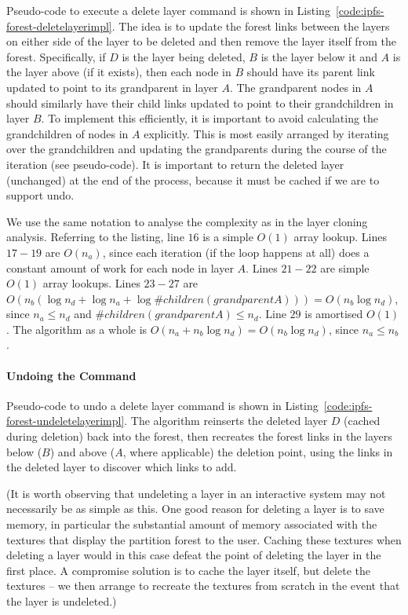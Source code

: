Pseudo-code to execute a delete layer command is shown in Listing~\ref{code:ipfs-forest-deletelayerimpl}. The idea is to update the forest links between the layers on either side of the layer to be deleted and then remove the layer itself from the forest. Specifically, if $D$ is the layer being deleted, $B$ is the layer below it and $A$ is the layer above (if it exists), then each node in $B$ should have its parent link updated to point to its grandparent in layer $A$. The grandparent nodes in $A$ should similarly have their child links updated to point to their grandchildren in layer $B$. To implement this efficiently, it is important to avoid calculating the grandchildren of nodes in $A$ explicitly. This is most easily arranged by iterating over the grandchildren and updating the grandparents during the course of the iteration (see pseudo-code). It is important to return the deleted layer (unchanged) at the end of the process, because it must be cached if we are to support undo.

We use the same notation to analyse the complexity as in the layer cloning analysis. Referring to the listing, line $16$ is a simple $O(1)$ array lookup. Lines $17-19$ are $O(n_a)$, since each iteration (if the loop happens at all) does a constant amount of work for each node in layer $A$. Lines $21-22$ are simple $O(1)$ array lookups. Lines $23-27$ are $O(n_b (\log n_d + \log n_a + \log \#\mathit{children}(\mathit{grandparentA}))) = O(n_b \log n_d)$, since $n_a \le n_d$ and $\#\mathit{children}(\mathit{grandparentA}) \le n_d$. Line $29$ is amortised $O(1)$. The algorithm as a whole is $O(n_a + n_b \log n_d) = O(n_b \log n_d)$, since $n_a \le n_b$.

\paragraph{Undoing the Command}

Pseudo-code to undo a delete layer command is shown in Listing~\ref{code:ipfs-forest-undeletelayerimpl}. The algorithm reinserts the deleted layer $D$ (cached during deletion) back into the forest, then recreates the forest links in the layers below ($B$) and above ($A$, where applicable) the deletion point, using the links in the deleted layer to discover which links to add.

(It is worth observing that undeleting a layer in an interactive system may not necessarily be as simple as this. One good reason for deleting a layer is to save memory, in particular the substantial amount of memory associated with the textures that display the partition forest to the user. Caching these textures when deleting a layer would in this case defeat the point of deleting the layer in the first place. A compromise solution is to cache the layer itself, but delete the textures -- we then arrange to recreate the textures from scratch in the event that the layer is undeleted.)

